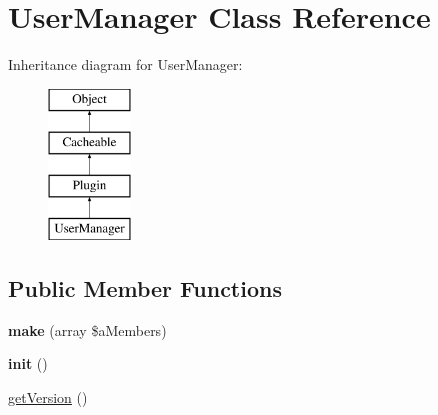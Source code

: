 \hypertarget{class_user_manager}{\section{User\-Manager Class Reference}
\label{class_user_manager}
}
Inheritance diagram for User\-Manager\-:\begin{figure}[H]
\begin{center}
\leavevmode
\includegraphics[height=4.000000cm]{class_user_manager}
\end{center}
\end{figure}
\subsection*{Public Member Functions}
\begin{DoxyCompactItemize}
\item 
\hypertarget{class_user_manager_a215176cb90aff1e112203184c032c93b}{{\bfseries make} (array \$a\-Members)}\label{class_user_manager_a215176cb90aff1e112203184c032c93b}

\item 
\hypertarget{class_user_manager_a3c8843e95768c118eff28e60a9407801}{{\bfseries init} ()}\label{class_user_manager_a3c8843e95768c118eff28e60a9407801}

\item 
\hyperlink{class_user_manager_adb78417be801fe52fdf9a0352530908d}{get\-Version} ()
\end{DoxyCompactItemize}
